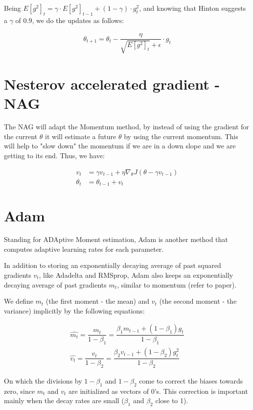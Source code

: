 \documentclass[10pt]{article} %
\theoremstyle{question-style}
\begin{document}
\begin{flushleft}
Being $E[g^2]_t = \gamma \cdot E[g^2]_{t-1} + (1 - \gamma) \cdot g_t^2$, and knowing that Hinton suggests a $\gamma$ of $0.9$, we do the updates as follows:

\begin{align*}
    \theta_{t+1} = \theta_t - \dfrac{\eta}{\sqrt{E[g^2]_t} + \epsilon} \cdot g_t
\end{align*}


\section{Nesterov accelerated gradient - NAG}
The NAG will adapt the Momentum method, by instead of using the gradient for the current $\theta$ it will estimate a future $\theta$ by using the current momentum. This will help to "slow down" the momentum if we are in a down slope and we are getting to its end. Thus, we have:

\begin{align*}
    v_t &= \gamma v_{t-1} + \eta \nabla_{\theta}J(\theta - \gamma v_{t-1}) \\
    \theta_t &= \theta_{t-1} + v_t 
\end{align*}

\section{Adam}

Standing for ADAptive Moment estimation, Adam is another method that computes adaptive learning rates for each parameter. 

In addition to storing an exponentially decaying average of past squared gradients $v_t$, like Adadelta and RMSprop, Adam also keeps an exponentially decaying average of past gradients $m_t$, similar to momentum (refer to paper).

We define $m_t$ (the first moment - the mean) and $v_t$ (the second moment - the variance) implicitly by the following equations:

\begin{align*}
    \hat{m_t} = \dfrac{m_t}{1-\beta_1} = \dfrac{\beta_1 m_{t-1} + (1-\beta_1)g_t}{1-\beta_1}
    \\
    \hat{v_t} = \dfrac{v_t}{1-\beta_2} = \dfrac{\beta_2 v_{t-1} + (1-\beta_2)g_t^2}{1-\beta_2}
\end{align*}

On which the divisions by $1-\beta_1$ and $1-\beta_2$ come to correct the biases towards zero, since $m_t$ and $v_t$ are initialized as vectors of 0's. This correction is important mainly when the decay rates are small ($\beta_1$ and $\beta_2$ close to 1).


\end{flushleft}
\end{document}
